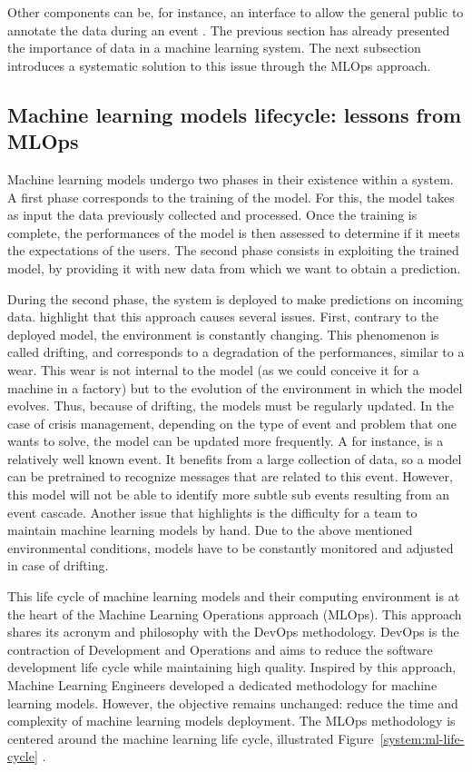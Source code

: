 Other components can be, for instance, an interface to allow the general public to annotate the data during an event \parencite{imranAIDRArtificialIntelligence2014}.
The previous section has already presented the importance of data in a machine learning system.
The next subsection introduces a systematic solution to this issue through the MLOps approach.

\subsection{Machine learning models lifecycle: lessons from MLOps}
Machine learning models undergo two phases in their existence within a system.
A first phase corresponds to the training of the model.
For this, the model takes as input the data previously collected and processed.
Once the training is complete, the performances of the model is then assessed to determine if it meets the expectations of the users.
The second phase consists in exploiting the trained model, by providing it with new data from which we want to obtain a prediction.

During the second phase, the system is deployed to make predictions on incoming data.
\textcite[Chapter~1]{treveilIntroducingMLOps2020} highlight that this approach causes several issues.
First, contrary to the deployed model, the environment is constantly changing.
This phenomenon is called drifting, and corresponds to a degradation of the performances, similar to a wear.
This wear is not internal to the model (as we could conceive it for a machine in a factory) but to the evolution of the environment in which the model evolves.
Thus, because of drifting, the models must be regularly updated.
In the case of crisis management, depending on the type of event and problem that one wants to solve, the model can be updated more frequently.
A for instance, is a relatively well known event.
It benefits from a large collection of data, so a model can be pretrained to recognize messages that are related to this event.
However, this model will not be able to identify more subtle sub events resulting from an event cascade.
Another issue that \citeauthor{treveilIntroducingMLOps2020} highlights is the difficulty for a team to maintain machine learning models by hand.
Due to the above mentioned environmental conditions, models have to be constantly monitored and adjusted in case of drifting.

This life cycle of machine learning models and their computing environment is at the heart of the Machine Learning Operations approach (MLOps).
This approach shares its acronym and philosophy with the DevOps methodology.
DevOps is the contraction of Development and Operations and aims to reduce the software development life cycle while maintaining high quality.
Inspired by this approach, Machine Learning Engineers developed a dedicated methodology for machine learning models.
However, the objective remains unchanged: reduce the time and complexity of machine learning models deployment.
The MLOps methodology is centered around the machine learning life cycle, illustrated Figure~\ref{system:ml-life-cycle} \parencite{treveilIntroducingMLOps2020,burkovMachineLearningEngineering2020}.

